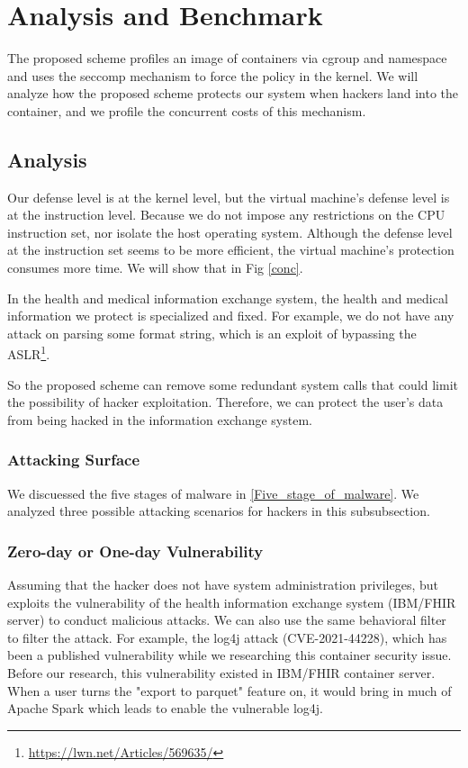 \section{Analysis and Benchmark}

The proposed scheme profiles an image of containers via cgroup and namespace
and uses the seccomp mechanism to force the policy in the kernel.
We will analyze how the proposed scheme protects our system when hackers land
into the container, and we profile the concurrent costs of this
mechanism.

\subsection{Analysis}
Our defense level is at the kernel level, but the virtual machine's
defense level is at the instruction level. Because we do not impose any
restrictions on the CPU instruction set, nor isolate the host operating system.
Although the defense level at the instruction set seems to be more efficient,
the virtual machine's protection consumes more time. We will show that in Fig \ref{conc}.

In the health and medical information exchange system, the health and
medical information we protect is specialized and fixed. For example,
we do not have any attack on parsing some format string,
which is an exploit of bypassing the ASLR\footnote{\url{https://lwn.net/Articles/569635/}}.

So the proposed scheme can remove some redundant system calls that could
limit the possibility of hacker exploitation. Therefore, we can protect
the user's data from being hacked in the information exchange system.

\subsubsection{Attacking Surface}
We discuessed the five stages of malware in \ref{Five_stage_of_malware}. We analyzed
three possible attacking scenarios for hackers in this subsubsection.

\subsubsection{Zero-day or One-day Vulnerability}
Assuming that the hacker does not have system administration privileges,
but exploits the vulnerability of the health information exchange system
(IBM/FHIR server) to conduct malicious attacks. We can also use the same
behavioral filter to filter the attack.
For example, the log4j attack (CVE-2021-44228), which has been a published
vulnerability while we researching this container security issue.
Before our research, this vulnerability existed in IBM/FHIR container server.
When a user turns the "export to parquet" feature on, it would
bring in much of Apache Spark which leads to enable the vulnerable log4j.

